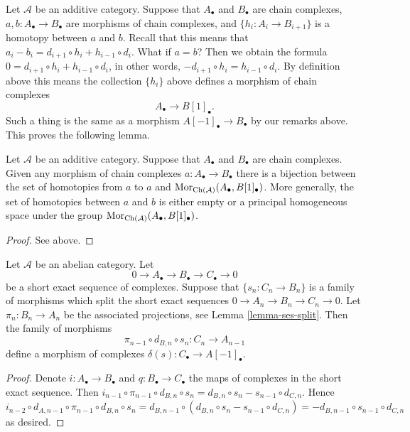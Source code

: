 \medskip\noindent
Let $\mathcal{A}$ be an additive category.
Suppose that $A_\bullet$ and $B_\bullet$ are
chain complexes, $a, b : A_\bullet \to B_\bullet$ are
morphisms of chain complexes, and $\{h_i : A_i \to B_{i + 1}\}$
is a homotopy between $a$ and $b$. Recall that this means
that
$a_i - b_i = d_{i + 1} \circ h_i + h_{i - 1} \circ d_i$.
What if $a = b$? Then we obtain the formula
$0 = d_{i + 1} \circ h_i + h_{i - 1} \circ d_i$,
in other words, $ - d_{i + 1} \circ h_i = h_{i - 1} \circ d_i$.
By definition above this means the collection $\{h_i\}$
above defines a morphism of chain complexes
$$
A_\bullet \longrightarrow B[1]_\bullet.
$$
Such a thing is the same as a morphism $A[-1]_\bullet \to B_\bullet$
by our remarks above. This proves the following lemma.

\begin{lemma}
\label{lemma-homotopy-shift}
Let $\mathcal{A}$ be an additive category.
Suppose that $A_\bullet$ and $B_\bullet$ are
chain complexes. Given any morphism of chain
complexes $a : A_\bullet \to B_\bullet$ there
is a bijection between the set of homotopies
from $a$ to $a$ and
$\mathop{\mathrm{Mor}}\nolimits_{\text{Ch}(\mathcal{A})}(A_\bullet, B[1]_\bullet)$.
More generally, the set of homotopies between
$a$ and $b$ is either empty or a principal homogeneous
space under the group
$\mathop{\mathrm{Mor}}\nolimits_{\text{Ch}(\mathcal{A})}(A_\bullet, B[1]_\bullet)$.
\end{lemma}

\begin{proof}
See above.
\end{proof}

\begin{lemma}
\label{lemma-ses-termwise-split}
Let $\mathcal{A}$ be an abelian category.
Let
$$
0 \to A_\bullet \to B_\bullet \to C_\bullet \to 0
$$
be a short exact sequence of complexes.
Suppose that $\{s_n : C_n \to B_n\}$ is a family
of morphisms which split the short exact sequences
$0 \to A_n \to B_n \to C_n \to 0$. Let
$\pi_n : B_n \to A_n$ be the associated
projections, see Lemma \ref{lemma-ses-split}.
Then the family of morphisms
$$
\pi_{n - 1} \circ d_{B, n} \circ s_n
:
C_n \to A_{n - 1}
$$
define a morphism of complexes $\delta(s) : C_\bullet \to A[-1]_\bullet$.
\end{lemma}

\begin{proof}
Denote $i : A_\bullet \to B_\bullet$ and $q : B_\bullet \to C_\bullet$
the maps of complexes in the short exact sequence. Then
$i_{n - 1} \circ \pi_{n - 1} \circ d_{B, n} \circ s_n =
d_{B, n} \circ s_n - s_{n - 1} \circ d_{C, n}$. Hence
$i_{n - 2} \circ d_{A, n - 1} \circ \pi_{n - 1} \circ d_{B, n} \circ s_n =
d_{B, n - 1} \circ (d_{B, n} \circ s_n - s_{n - 1} \circ d_{C, n}) =
- d_{B, n - 1} \circ s_{n - 1} \circ d_{C, n}$ as desired.
\end{proof}

